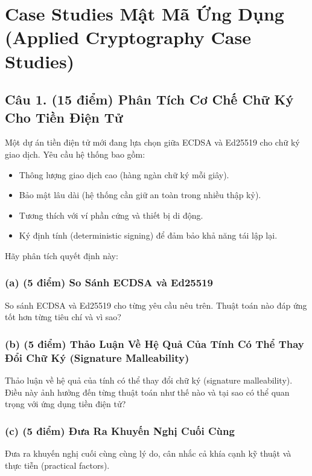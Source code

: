 \section{Case Studies Mật Mã Ứng Dụng (Applied Cryptography Case Studies)}

\subsection{Câu 1. (15 điểm) Phân Tích Cơ Chế Chữ Ký Cho Tiền Điện Tử}

Một dự án tiền điện tử mới đang lựa chọn giữa ECDSA và Ed25519 cho chữ ký giao dịch. Yêu cầu hệ thống bao gồm:
\begin{itemize}
    \item Thông lượng giao dịch cao (hàng ngàn chữ ký mỗi giây).
    \item Bảo mật lâu dài (hệ thống cần giữ an toàn trong nhiều thập kỷ).
    \item Tương thích với ví phần cứng và thiết bị di động.
    \item Ký định tính (deterministic signing) để đảm bảo khả năng tái lập lại.
\end{itemize}

Hãy phân tích quyết định này:

\subsubsection{(a) (5 điểm) So Sánh ECDSA và Ed25519}

So sánh ECDSA và Ed25519 cho từng yêu cầu nêu trên. Thuật toán nào đáp ứng tốt hơn từng tiêu chí và vì sao?

\subsubsection{(b) (5 điểm) Thảo Luận Về Hệ Quả Của Tính Có Thể Thay Đổi Chữ Ký (Signature Malleability)}

Thảo luận về hệ quả của tính có thể thay đổi chữ ký (signature malleability). Điều này ảnh hưởng đến từng thuật toán như thế nào và tại sao có thể quan trọng với ứng dụng tiền điện tử?

\subsubsection{(c) (5 điểm) Đưa Ra Khuyến Nghị Cuối Cùng}

Đưa ra khuyến nghị cuối cùng cùng lý do, cân nhắc cả khía cạnh kỹ thuật và thực tiễn (practical factors).

